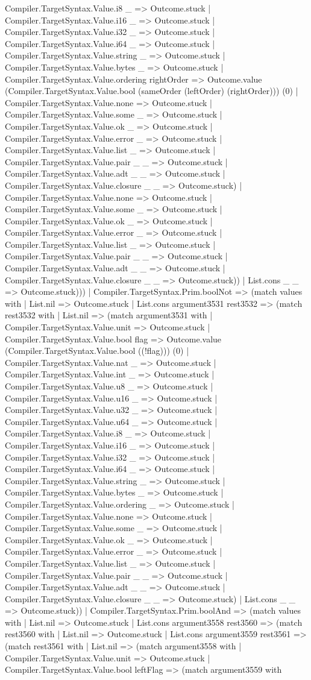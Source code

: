 \documentclass[11pt]{article}
\begin{document}
Compiler.TargetSyntax.Value.i8 \_ => Outcome.stuck | Compiler.TargetSyntax.Value.i16 \_ => Outcome.stuck | Compiler.TargetSyntax.Value.i32 \_ => Outcome.stuck | Compiler.TargetSyntax.Value.i64 \_ => Outcome.stuck | Compiler.TargetSyntax.Value.string \_ => Outcome.stuck | Compiler.TargetSyntax.Value.bytes \_ => Outcome.stuck | Compiler.TargetSyntax.Value.ordering rightOrder => Outcome.value (Compiler.TargetSyntax.Value.bool (sameOrder (leftOrder) (rightOrder))) (0) | Compiler.TargetSyntax.Value.none => Outcome.stuck | Compiler.TargetSyntax.Value.some \_ => Outcome.stuck | Compiler.TargetSyntax.Value.ok \_ => Outcome.stuck | Compiler.TargetSyntax.Value.error \_ => Outcome.stuck | Compiler.TargetSyntax.Value.list \_ => Outcome.stuck | Compiler.TargetSyntax.Value.pair \_ \_ => Outcome.stuck | Compiler.TargetSyntax.Value.adt \_ \_ => Outcome.stuck | Compiler.TargetSyntax.Value.closure \_ \_ => Outcome.stuck) | Compiler.TargetSyntax.Value.none => Outcome.stuck | Compiler.TargetSyntax.Value.some \_ => Outcome.stuck | Compiler.TargetSyntax.Value.ok \_ => Outcome.stuck | Compiler.TargetSyntax.Value.error \_ => Outcome.stuck | Compiler.TargetSyntax.Value.list \_ => Outcome.stuck | Compiler.TargetSyntax.Value.pair \_ \_ => Outcome.stuck | Compiler.TargetSyntax.Value.adt \_ \_ => Outcome.stuck | Compiler.TargetSyntax.Value.closure \_ \_ => Outcome.stuck)) | List.cons \_ \_ => Outcome.stuck))) | Compiler.TargetSyntax.Prim.boolNot => (match values with | List.nil => Outcome.stuck | List.cons argument3531 rest3532 => (match rest3532 with | List.nil => (match argument3531 with | Compiler.TargetSyntax.Value.unit => Outcome.stuck | Compiler.TargetSyntax.Value.bool flag => Outcome.value (Compiler.TargetSyntax.Value.bool ((!flag))) (0) | Compiler.TargetSyntax.Value.nat \_ => Outcome.stuck | Compiler.TargetSyntax.Value.int \_ => Outcome.stuck | Compiler.TargetSyntax.Value.u8 \_ => Outcome.stuck | Compiler.TargetSyntax.Value.u16 \_ => Outcome.stuck | Compiler.TargetSyntax.Value.u32 \_ => Outcome.stuck | Compiler.TargetSyntax.Value.u64 \_ => Outcome.stuck | Compiler.TargetSyntax.Value.i8 \_ => Outcome.stuck | Compiler.TargetSyntax.Value.i16 \_ => Outcome.stuck | Compiler.TargetSyntax.Value.i32 \_ => Outcome.stuck | Compiler.TargetSyntax.Value.i64 \_ => Outcome.stuck | Compiler.TargetSyntax.Value.string \_ => Outcome.stuck | Compiler.TargetSyntax.Value.bytes \_ => Outcome.stuck | Compiler.TargetSyntax.Value.ordering \_ => Outcome.stuck | Compiler.TargetSyntax.Value.none => Outcome.stuck | Compiler.TargetSyntax.Value.some \_ => Outcome.stuck | Compiler.TargetSyntax.Value.ok \_ => Outcome.stuck | Compiler.TargetSyntax.Value.error \_ => Outcome.stuck | Compiler.TargetSyntax.Value.list \_ => Outcome.stuck | Compiler.TargetSyntax.Value.pair \_ \_ => Outcome.stuck | Compiler.TargetSyntax.Value.adt \_ \_ => Outcome.stuck | Compiler.TargetSyntax.Value.closure \_ \_ => Outcome.stuck) | List.cons \_ \_ => Outcome.stuck)) | Compiler.TargetSyntax.Prim.boolAnd => (match values with | List.nil => Outcome.stuck | List.cons argument3558 rest3560 => (match rest3560 with | List.nil => Outcome.stuck | List.cons argument3559 rest3561 => (match rest3561 with | List.nil => (match argument3558 with | Compiler.TargetSyntax.Value.unit => Outcome.stuck | Compiler.TargetSyntax.Value.bool leftFlag => (match argument3559 with 
\end{document}
